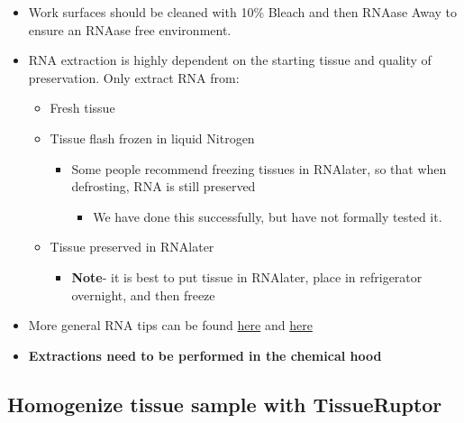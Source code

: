 \documentclass[
  letterpaper,
  DIV=11,
  numbers=noendperiod]{scrreprt}
\providecommand{\tightlist}{%
  \setlength{\itemsep}{0pt}\setlength{\parskip}{0pt}}\usepackage{longtable,booktabs,array}
\begin{document}
\begin{itemize}
\item
  Work surfaces should be cleaned with 10\% Bleach and then RNAase Away
  to ensure an RNAase free environment.
\item
  RNA extraction is highly dependent on the starting tissue and quality
  of preservation. Only extract RNA from:

  \begin{itemize}
  \item
    Fresh tissue
  \item
    Tissue flash frozen in liquid Nitrogen

    \begin{itemize}
    \item
      Some people recommend freezing tissues in RNAlater, so that when
      defrosting, RNA is still preserved

      \begin{itemize}
      \tightlist
      \item
        We have done this successfully, but have not formally tested it.
      \end{itemize}
    \end{itemize}
  \item
    Tissue preserved in RNAlater

    \begin{itemize}
    \tightlist
    \item
      \textbf{Note}- it is best to put tissue in RNAlater, place in
      refrigerator overnight, and then freeze
    \end{itemize}
  \end{itemize}
\item
  More general RNA tips can be found
  \href{https://www.thermofisher.com/us/en/home/references/ambion-tech-support/nuclease-enzymes/general-articles/working-with-rna.html}{here}
  and
  \href{https://www.thermofisher.com/us/en/home/references/ambion-tech-support/rna-isolation/general-articles/the-basics-rna-isolation.html}{here}
\item
  \textbf{Extractions need to be performed in the chemical hood}
\end{itemize}

\hypertarget{homogenize-tissue-sample-with-tissueruptor}{%
\subsection*{\texorpdfstring{\textbf{Homogenize tissue sample with
TissueRuptor}}{Homogenize tissue sample with TissueRuptor}}\label{homogenize-tissue-sample-with-tissueruptor}}
\end{document}
